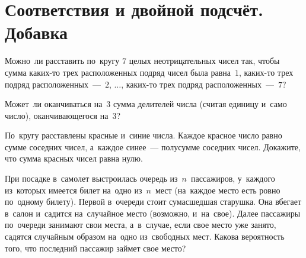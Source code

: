 
\section*{Соответствия и двойной подсчёт. Добавка}


\begin{problems}

\item
Можно~ли расставить по~кругу $7$ целых неотрицательных чисел так, чтобы сумма
каких-то трех расположенных подряд чисел была равна~$1$,
каких-то трех подряд расположенных~---~$2$, $\ldots$,
каких-то трех подряд расположенных~---~$7$?

\item
Может~ли оканчиваться на~$3$ сумма делителей числа (считая единицу и~само
число), оканчивающегося на~$3$?

\item
По~кругу расставлены красные и~синие числа.
Каждое красное число равно сумме соседних чисел, а~каждое синее~--- полусумме
соседних чисел.
Докажите, что сумма красных чисел равна нулю.

\item
При посадке в~самолет выстроилась очередь из~$n$~пассажиров, у~каждого
из~которых имеется билет на~одно из~$n$~мест (на~каждое место есть ровно
по~одному билету).
Первой в~очереди стоит сумасшедшая старушка.
Она вбегает в~салон и~садится на~случайное место (возможно, и~на~свое).
Далее пассажиры по~очереди занимают свои места, а~в~случае, если свое место уже
занято, садятся случайным образом на~одно из~свободных мест.
Какова вероятность того, что последний пассажир займет свое место?

\end{problems}

